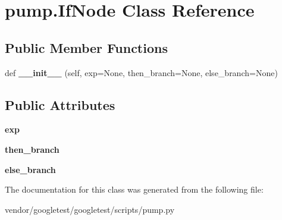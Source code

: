 \hypertarget{classpump_1_1_if_node}{}\section{pump.\+If\+Node Class Reference}
\label{classpump_1_1_if_node}
\subsection*{Public Member Functions}
\begin{DoxyCompactItemize}
\item 
\mbox{\label{classpump_1_1_if_node_ab8bff21c18d60b461f7b6fa9dfa59f7c}} 
def {\bfseries \+\_\+\+\_\+init\+\_\+\+\_\+} (self, exp=None, then\+\_\+branch=None, else\+\_\+branch=None)
\end{DoxyCompactItemize}
\subsection*{Public Attributes}
\begin{DoxyCompactItemize}
\item 
\mbox{\label{classpump_1_1_if_node_a92042e4262196ffd7366350539f512d8}} 
{\bfseries exp}
\item 
\mbox{\label{classpump_1_1_if_node_aa9e2e488564629f8dc0d64d165a19ffa}} 
{\bfseries then\+\_\+branch}
\item 
\mbox{\label{classpump_1_1_if_node_a12e422b16ed4291f15cd95cd6e7f81eb}} 
{\bfseries else\+\_\+branch}
\end{DoxyCompactItemize}


The documentation for this class was generated from the following file\+:\begin{DoxyCompactItemize}
\item 
vendor/googletest/googletest/scripts/pump.\+py\end{DoxyCompactItemize}
